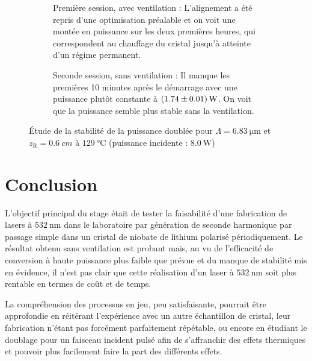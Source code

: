 \documentclass[11pt,a4paper]{article}
\newcommand{\lmbd}[1]{$\SI{#1}{\nano\metre}$}
\newcommand{\zr}{z_\mathsc{R}}
\newcommand{\mathsc}[1]{\mathrm{\scriptscriptstyle {#1}}}
\begin{document}
\begin{figure}[htpb]  
\centering
\begin{subfigure}[b]{\textwidth}
	\centering
	
	\caption{Première session, avec ventilation : \small L'alignement a été repris d'une optimisation préalable et on voit une montée en puissance sur les deux premières heures, qui correspondent au chauffage du cristal jusqu'à atteinte d'un régime permanent.}
	\label{fig:mesc1}
\end{subfigure}
\begin{subfigure}[b]{\textwidth}
	\centering
	\vspace*{0.8cm}
	
	\caption{Seconde session, sans ventilation : \small Il manque les premières 10 minutes après le démarrage avec une puissance plutôt constante à $\SI{1.74+-0.01}{\watt}$. On voit que la puissance semble plus stable sans la ventilation.}
	\label{fig:mesc2}
\end{subfigure}
\caption{Étude de la stabilité de la puissance doublée pour $\Lambda=\SI{6.83}{\micro\meter}$ et $\zr = \SI{0.6}{cm}$ à $\SI{129}{\celsius}$ (puissance incidente : $\SI{8.0}{\watt}$)}
\end{figure}


\section{Conclusion}
L'objectif principal du stage était de tester la faisabilité d'une fabrication de lasers à \lmbd{532} dans le laboratoire par génération de seconde harmonique par passage simple dans un cristal de niobate de lithium polarisé périodiquement. Le résultat obtenu sans ventilation est probant mais, au vu de l'efficacité de conversion à haute puissance plus faible que prévue et du manque de stabilité mis en évidence, il n'est pas clair que cette réalisation d'un laser à \lmbd{532} soit plus rentable en termes de coût et de temps.

La compréhension des processus en jeu, peu satisfaisante, pourrait être approfondie en réitérant l'expérience avec un autre échantillon de cristal, leur fabrication n'étant pas forcément parfaitement répétable, ou encore en étudiant le doublage pour un faisceau incident pulsé afin de s'affranchir des effets thermiques et pouvoir plus facilement faire la part des différents effets.

\end{document}
